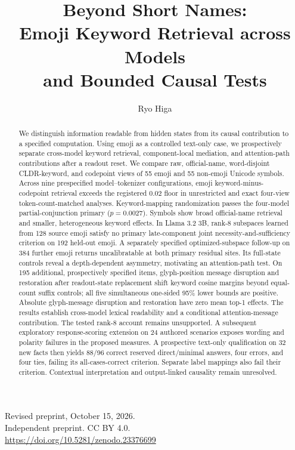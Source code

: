 \documentclass{article}
\title{Beyond Short Names:\\Emoji Keyword Retrieval across Models\\
and Bounded Causal Tests}
\author{Ryo Higa}
\date{}
\begin{document}
\maketitle

\begin{center}
\small Revised preprint, October 15, 2026.\\
Independent preprint. CC BY 4.0.\\
\url{https://doi.org/10.5281/zenodo.23376699}
\end{center}

\begin{abstract}
We distinguish information readable from hidden states from its causal
contribution to a specified computation. Using emoji as a controlled text-only
case, we prospectively separate cross-model keyword retrieval,
component-local mediation, and attention-path contributions after a readout reset.
We compare raw, official-name,
word-disjoint CLDR-keyword, and codepoint views of 55 emoji and 55 non-emoji
Unicode symbols. Across nine prespecified model--tokenizer configurations,
emoji keyword-minus-codepoint retrieval exceeds the registered 0.02 floor
in unrestricted and exact four-view token-count-matched analyses.
Keyword-mapping randomization passes the four-model
partial-conjunction primary ($p=0.0027$). Symbols show broad official-name retrieval and smaller,
heterogeneous keyword effects. In Llama 3.2 3B, rank-8 subspaces learned from
128 source emoji satisfy no primary late-component joint
necessity-and-sufficiency criterion on 192 held-out emoji. A separately
specified optimized-subspace follow-up on 384 further emoji returns
uncalibratable at both primary residual sites. Its full-state controls reveal
a depth-dependent asymmetry, motivating an attention-path test. On 195
additional, prospectively specified items, glyph-position message disruption
and restoration after readout-state replacement shift keyword cosine margins
beyond equal-count suffix controls; all five simultaneous one-sided 95\%
lower bounds are positive. Absolute glyph-message disruption and restoration
have zero mean top-1 effects. The results establish cross-model lexical
readability and a conditional attention-message contribution. The tested
rank-8 account remains unsupported. A subsequent exploratory response-scoring
extension on 24 authored scenarios exposes wording and polarity failures in
the proposed measures. A prospective text-only qualification on 32 new facts
then yields 88/96 correct reserved direct/minimal answers, four errors, and
four ties, failing its all-cases-correct criterion. Separate label mappings
also fail their criterion. Contextual interpretation and output-linked
causality remain unresolved.
\end{abstract}
\end{document}
